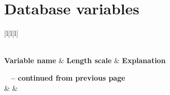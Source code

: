 \chapter{Database variables}
\begingroup
\renewcommand\arraystretch{0.75}
\footnotesize
\begin{longtable}{|l|l|l|}
	\caption[]{list of variables}\label{tab:long}\\  \hline
	\textbf{Variable name} & \textbf{Length scale} & \textbf{Explanation} \\ \hline
	\endfirsthead
	
	{{\bfseries \tablename\ \thetable{} -- continued from previous page}} \\
	\hline {} &
	 &
	 \\ \hline 
	\endhead
	
	\endfoot
	\endlastfoot
	

\end{longtable}
